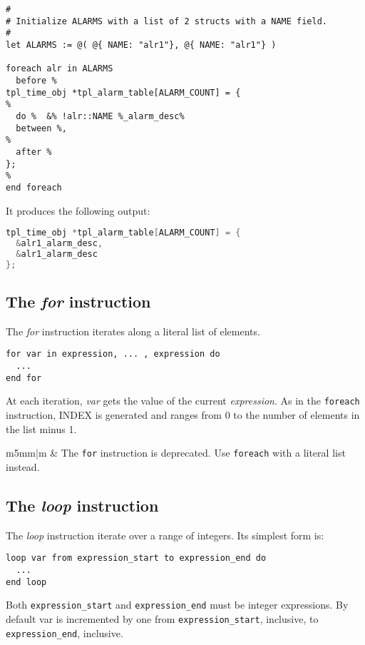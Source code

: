 \documentclass[11pt]{article}
\newcommand{\var}[1]{{\small\ttfamily #1}}
\newcommand\Warning{%
 \makebox[1.4em][c]{%
 \makebox[0pt][c]{\raisebox{-.05em}{\scriptsize!}}%
 \makebox[0pt][c]{\raisebox{-.2em}{\color{red}\Large$\bigtriangleup$}}}}%
\newcommand{\warning}[1]{%
\vspace{1em}
\hspace{-18.3mm}
\rowcolors{1}{white}{light-gray}
\begin{tabular}[b]{m{5mm}|m{\linewidth}}
\Warning & #1\\
\end{tabular}
}
\begin{document}
\begin{lstlisting}
#
# Initialize ALARMS with a list of 2 structs with a NAME field.
#
let ALARMS := @( @{ NAME: "alr1"}, @{ NAME: "alr1"} )

foreach alr in ALARMS
  before %
tpl_time_obj *tpl_alarm_table[ALARM_COUNT] = {
%
  do %  &% !alr::NAME %_alarm_desc%
  between %,
%
  after %
};
%
end foreach
\end{lstlisting}

It produces the following output:

\begin{lstlisting}[language=C]
tpl_time_obj *tpl_alarm_table[ALARM_COUNT] = {
  &alr1_alarm_desc,
  &alr1_alarm_desc
};
\end{lstlisting}

\subsection{The {\em for} instruction}

The {\em for} instruction iterates along a literal list of elements.

\begin{lstlisting}
for var in expression, ... , expression do
  ...
end for
\end{lstlisting}

At each iteration, {\em var} gets the value of the current {\em expression}. As in the \lstinline{foreach} instruction, \var{INDEX} is generated and ranges from 0 to the number of elements in the list minus 1.

\warning{The \lstinline{for} instruction is deprecated. Use \lstinline{foreach} with a literal list instead.}

\subsection{The {\em loop} instruction}

The {\em loop} instruction iterate over a range of integers. Its simplest form is:

\begin{lstlisting}
loop var from expression_start to expression_end do
  ...
end loop
\end{lstlisting}

Both \lstinline{expression_start} and \lstinline{expression_end} must be integer expressions. By default \var{var} is incremented by one from \lstinline{expression_start}, inclusive, to \lstinline{expression_end}, inclusive. 
\end{document}
